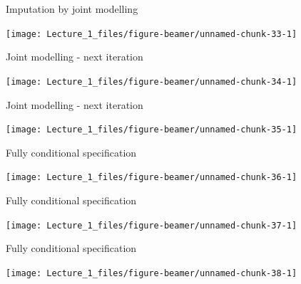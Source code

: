 \documentclass[ignorenonframetext,aspectratio=43]{beamer}
\begin{document}
\begin{frame}{Imputation by joint modelling}
\protect\hypertarget{imputation-by-joint-modelling-3}{}

\begin{center}\texttt{[image: Lecture\_1\_files/figure-beamer/unnamed-chunk-33-1]} \end{center}

\end{frame}

\begin{frame}{Joint modelling - next iteration}
\protect\hypertarget{joint-modelling---next-iteration}{}

\begin{center}\texttt{[image: Lecture\_1\_files/figure-beamer/unnamed-chunk-34-1]} \end{center}

\end{frame}

\begin{frame}{Joint modelling - next iteration}
\protect\hypertarget{joint-modelling---next-iteration-1}{}

\begin{center}\texttt{[image: Lecture\_1\_files/figure-beamer/unnamed-chunk-35-1]} \end{center}

\end{frame}

\begin{frame}{Fully conditional specification}
\protect\hypertarget{fully-conditional-specification}{}

\begin{center}\texttt{[image: Lecture\_1\_files/figure-beamer/unnamed-chunk-36-1]} \end{center}

\end{frame}

\begin{frame}{Fully conditional specification}
\protect\hypertarget{fully-conditional-specification-1}{}

\begin{center}\texttt{[image: Lecture\_1\_files/figure-beamer/unnamed-chunk-37-1]} \end{center}

\end{frame}

\begin{frame}{Fully conditional specification}
\protect\hypertarget{fully-conditional-specification-2}{}

\begin{center}\texttt{[image: Lecture\_1\_files/figure-beamer/unnamed-chunk-38-1]} \end{center}

\end{frame}
\end{document}
